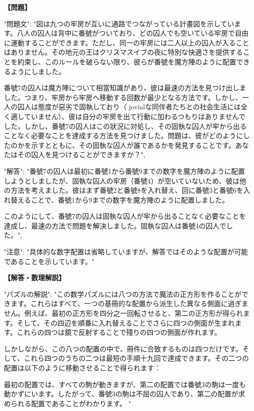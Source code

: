 \documentclass[10pt,a4paper,oneside,openany]{ltjsbook}
\begin{document}
\begin{tcolorbox}[colback=softblue,colframe=primaryblue,title=\textbf{第 401 問：EIGHT JOLLY GAOL BIRDS.},arc=2mm,boxrule=1pt,breakable]
\textbf{【問題】}\par\vspace{0.3em}
{
  "問題文": "図は九つの牢房が互いに通路でつながっている計畫図を示しています。八人の囚人は背中に番號がついており、どの囚人でも空いている牢房で自由に運動することができます。ただし、同一の牢房には二人以上の囚人が入ることはありません。その地元の王はクリスマスイブの夜に特別な快適さを提供することを約束し、このルールを破らない限り、彼らが番號を魔方陣のように配置できるようにしました。

番號7の囚人は魔方陣について相當知識があり、彼は最速の方法を見つけ出しました。つまり、牢房から牢房へ移動する回数が最少となる方法です。しかし、一人の囚人は態度が惡劣で固執しており（ jovialな同伴者たちとの社会生活には全く適していません）、彼は自分の牢房を出て行動に加わるつもりはありませんでした。しかし、番號7の囚人はこの狀況に対処し、その固執な囚人が牢から出ることなく必要なことを達成する方法を見つけました。問題は、彼がどのようにしたのかを示すとともに、その固執な囚人が誰であるかを発見することです。あなたはその囚人を見つけることができますか？",

  "解答": "番號7の囚人は最初に番號1から番號9までの数字を魔方陣のように配置しようとしましたが、固執な囚人の牢房（番號4）が空いていないため、彼は他の方法を考えました。彼はまず番號2と番號8を入れ替え、回に番號3と番號6を入れ替えることで、番號1から9までの数字を魔方陣のように配置しました。

このようにして、番號7の囚人は固執な囚人が牢から出ることなく必要なことを達成し、最速の方法で問題を解決しました。固執な囚人は番號4の囚人でした。",
  
  "注意": "具体的な数字配置は省略していますが、解答ではそのような配置が可能であることを示しています。"
}
\tcblower
\textbf{【解答・数理解説】}\par\vspace{0.3em}
{
  "パズルの解説": "この数学パズルには八つの方法で魔法の正方形を作ることができます。これらはすべて、一つの基冊的な配置から派生した異なる側面に過ぎません。例えば、最初の正方形を四分之一回転させると、第二の正方形が得られます。そして、その四辺を順番に入れ替えることでさらに四つの側面が生まれます。これらの四つは鏡で反射することで殘りの四つの側面が作れます。

しかしながら、この八つの配置の中で、冊件に合致するものは四つだけです。そして、これら四つのうちの二つは最短の手順十九回で達成できます。その二つの配置は以下のように移動させることで得られます：

最初の配置では、すべての駒が動きますが、第二の配置では番號3の駒は一度も動かずにいます。したがって、番號3の駒は不屈の囚人であり、第二の配置が求められる配置であることがわかります。
"
}
\end{tcolorbox}
\end{document}
